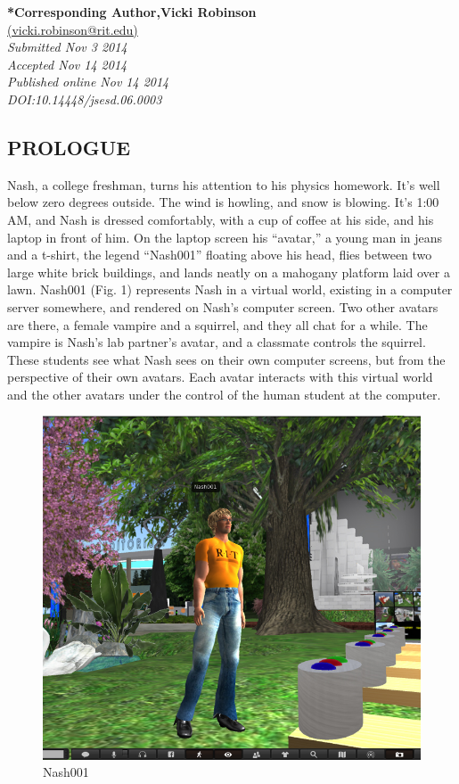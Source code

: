 \documentclass[11.5pt]{sig-alternate} %
\begin{document}
\textbf{*Corresponding Author,Vicki Robinson }\\
\href{mailto: vicki.robinson@rit.edu }{(vicki.robinson@rit.edu)} \\
\textit{Submitted  Nov 3 2014}\\
\textit{Accepted Nov 14 2014} \\
\textit{Published online Nov 14 2014} \\
\textit{DOI:10.14448/jsesd.06.0003} \\
\pagebreak
\clearpage
\begin{large}
\section*{PROLOGUE}
Nash, a college freshman, turns his attention to his physics homework. It’s well below zero degrees outside. The wind is howling, and snow is blowing. It’s 1:00 AM, and Nash is dressed comfortably, with a cup of coffee at his side, and his laptop in front of him. On the laptop screen his “avatar,” a young man in jeans and a t-shirt, the legend “Nash001” floating above his head, flies between two large white brick buildings, and lands neatly on a mahogany platform laid over a lawn. Nash001 (Fig. 1) represents Nash in a virtual world, existing in a computer server somewhere, and rendered on Nash’s computer screen. Two other avatars are there, a female vampire and a squirrel, and they all chat for a while. The vampire is Nash’s lab partner’s avatar, and a classmate controls the squirrel. These students see what Nash sees on their own computer screens, but from the perspective of their own avatars. Each avatar interacts with this virtual world and the other avatars under the control of the human student at the computer.

\begin{figure}[h]
    \centering
    \includegraphics[width=1\linewidth]{fig 1.jpg}
    \caption{Nash001}
\end{figure}

\end{large}
\end{document}
